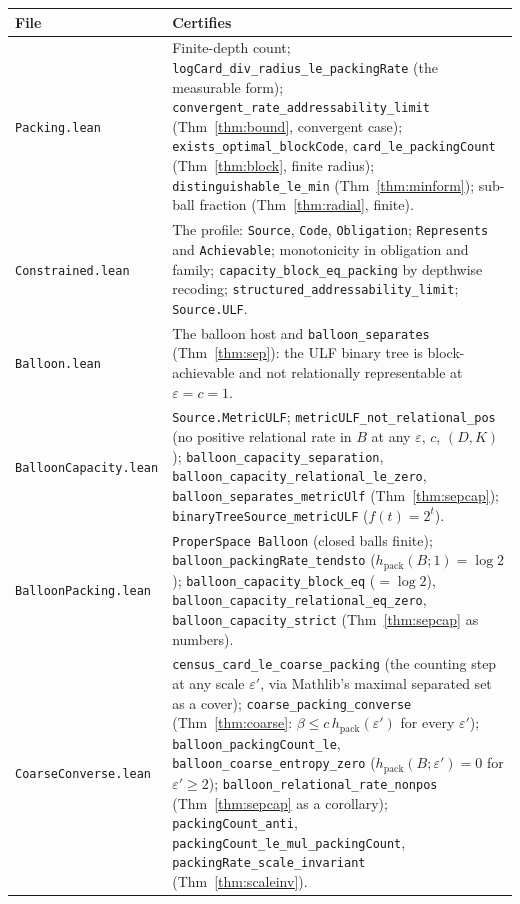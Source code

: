 \documentclass[11pt,reqno]{amsart}
\theoremstyle{plain}
\theoremstyle{definition}
\newcommand{\hpack}{h_{\mathrm{pack}}}
\newcommand{\eps}{\varepsilon}
\begin{document}
{\footnotesize
\begin{longtable}{@{}>{\raggedright\arraybackslash}p{3.3cm}>{\raggedright\arraybackslash}p{10.4cm}@{}}
\toprule
\textbf{File} & \textbf{Certifies} \\
\midrule
\texttt{Packing.lean} & Finite-depth count; \texttt{logCard\_div\_radius\_le\_packingRate} (the measurable form); \texttt{convergent\_rate\_addressability\_limit} (Thm~\ref{thm:bound}, convergent case); \texttt{exists\_optimal\_blockCode}, \texttt{card\_le\_packingCount} (Thm~\ref{thm:block}, finite radius); \texttt{distinguishable\_le\_min} (Thm~\ref{thm:minform}); sub-ball fraction (Thm~\ref{thm:radial}, finite). \\
\texttt{Constrained.lean} & The profile: \texttt{Source}, \texttt{Code}, \texttt{Obligation}; \texttt{Represents} and \texttt{Achievable}; monotonicity in obligation and family; \texttt{capacity\_block\_eq\_packing} by depthwise recoding; \texttt{structured\_addressability\_limit}; \texttt{Source.ULF}. \\
\texttt{Balloon.lean} & The balloon host and \texttt{balloon\_separates} (Thm~\ref{thm:sep}): the ULF binary tree is block-achievable and not relationally representable at $\eps=c=1$. \\
\texttt{BalloonCapacity.lean} & \texttt{Source.MetricULF}; \texttt{metricULF\_not\_relational\_pos} (no positive relational rate in $B$ at any $\eps$, $c$, $(D,K)$); \texttt{balloon\_capacity\_separation}, \texttt{balloon\_capacity\_relational\_le\_zero}, \texttt{balloon\_separates\_metricUlf} (Thm~\ref{thm:sepcap}); \texttt{binaryTreeSource\_metricULF} ($f(t)=2^t$). \\
\texttt{BalloonPacking.lean} & \texttt{ProperSpace Balloon} (closed balls finite); \texttt{balloon\_packingRate\_tendsto} ($\hpack(B;1)=\log2$); \texttt{balloon\_capacity\_block\_eq} ($=\log2$), \texttt{balloon\_capacity\_relational\_eq\_zero}, \texttt{balloon\_capacity\_strict} (Thm~\ref{thm:sepcap} as numbers). \\
\texttt{CoarseConverse.lean} & \texttt{census\_card\_le\_coarse\_packing} (the counting step at any scale $\eps'$, via Mathlib's maximal separated set as a cover); \texttt{coarse\_packing\_converse} (Thm~\ref{thm:coarse}: $\beta\le c\,\hpack(\eps')$ for every $\eps'$); \texttt{balloon\_packingCount\_le}, \texttt{balloon\_coarse\_entropy\_zero} ($\hpack(B;\eps')=0$ for $\eps'\ge2$); \texttt{balloon\_relational\_rate\_nonpos} (Thm~\ref{thm:sepcap} as a corollary); \texttt{packingCount\_anti}, \texttt{packingCount\_le\_mul\_packingCount}, \texttt{packingRate\_scale\_invariant} (Thm~\ref{thm:scaleinv}). \\

\end{longtable}}
\end{document}
